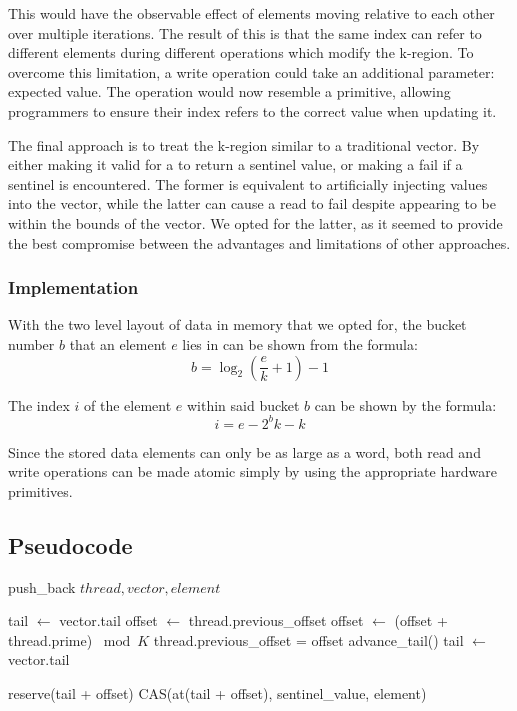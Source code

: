 \documentclass{sigplanconf}
\begin{document}
This would have the observable effect of elements moving relative to each other over multiple iterations. The result of this is that the same index can refer to different elements during different operations which modify the k-region. To overcome this limitation, a write operation could take an additional parameter: expected value. The operation would now resemble a  primitive, allowing programmers to ensure their index refers to the correct value when updating it.

The final approach is to treat the k-region similar to a traditional vector. By either making it valid for a  to return a sentinel value, or making a  fail if a sentinel is encountered. The former is equivalent to artificially injecting values into the vector, while the latter can cause a read to fail despite appearing to be within the bounds of the vector. We opted for the latter, as it seemed to provide the best compromise between the advantages and limitations of other approaches.

\subsubsection{Implementation}

With the two level layout of data in memory that we opted for, the bucket number $b$ that an element $e$ lies in can be shown from the formula:
  $$ b = \log_2\left(\frac{e}{k}+1\right)-1 $$

The index $i$ of the element $e$ within said bucket $b$ can be shown by the formula:
  $$ i = e - 2^{b}k - k $$

Since the stored data elements can only be as large as a word, both read and write operations can be made atomic simply by using the appropriate hardware primitives.

\subsection{Pseudocode}

\newcommand{\as}{$\leftarrow$ }
\newcommand{\eq}{$=$ }

\begin{algorithm}
\caption{push\_back $thread, vector, element$}
\begin{algorithmic}
\STATE tail \as vector.tail
\REPEAT
  \STATE offset \as thread.previous\_offset
  \WHILE{at(tail + offset) \eq sentinel\_value}
    \STATE offset \as (offset + thread.prime) $\bmod{K}$
    \STATE thread.previous\_offset = offset
    \IF{offset \eq 0}
      \STATE advance\_tail()
      \STATE tail \as vector.tail
    \ENDIF
  \ENDWHILE

  reserve(tail + offset)
\UNTIL CAS(at(tail + offset), sentinel\_value, element)
\end{algorithmic}
\label{alg:pushback}
\end{algorithm}
\end{document}
